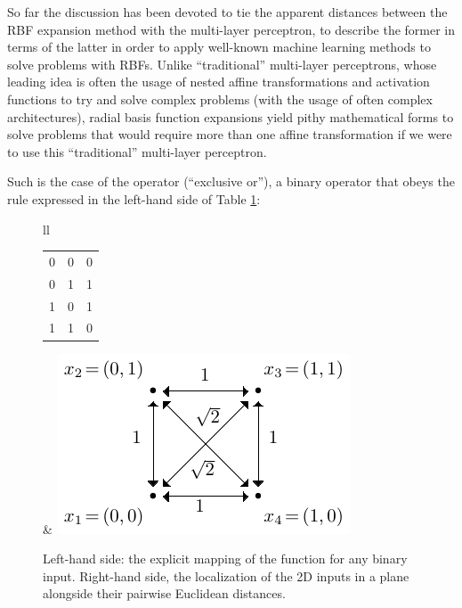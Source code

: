 \documentclass[12pt]{report} %
\newcommand{\tmverbatim}[1]{\text{{\ttfamily{#1}}}}
\begin{document}
So far the discussion has been devoted to tie the apparent distances between
the RBF expansion method with the multi-layer perceptron, to describe the
former in terms of the latter in order to apply well-known machine learning
methods to solve problems with RBFs. Unlike ``traditional'' multi-layer
perceptrons, whose leading idea is often the usage of nested affine
transformations and activation functions to try and solve complex problems
(with the usage of often complex architectures), radial basis function
expansions yield pithy mathematical forms to solve problems that would require
more than one affine transformation if we were to use this ``traditional''
multi-layer perceptron.

Such is the case of the \tmverbatim{xor} operator (``exclusive or''), a
binary operator that obeys the rule expressed in the left-hand side of Table
\ref{table-xor-distances}:

\begin{figure}[h]
  \begin{tabular}{ll}
    \frame
    {\begin{tabular}{|c|c|c|}
         \hline
         \tmverbatim{A} & \tmverbatim{B} & \tmverbatim{xor(A, B)} \\
         \hline
         0              & 0              & 0                      \\
         \hline
         0              & 1              & 1                      \\
         \hline
         1              & 0              & 1                      \\
         \hline
         1              & 1              & 0                      \\
         \hline
       \end{tabular}} &
    {\includegraphics[width=.41\textwidth]{imagenes/rbf_discussion/drawing-xor.pdf}}
  \end{tabular}
  \caption{Left-hand side: the explicit mapping of the \tmverbatim{xor}
    function for any binary input. Right-hand side, the localization of
    the 2D inputs in a plane alongside their pairwise Euclidean distances.
  }
  \label{table-xor-distances}
\end{figure}
\end{document}
